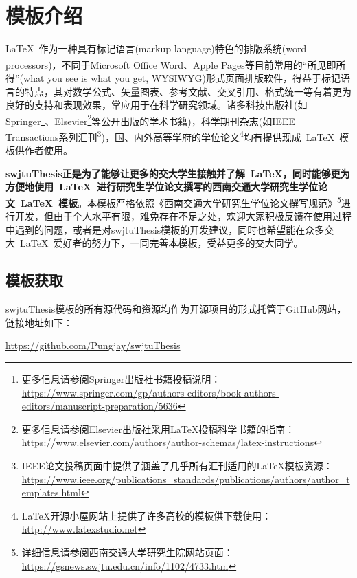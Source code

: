\chapter{模板介绍}\label{第1章}

\LaTeX{}~作为一种具有标记语言(markup language)特色的排版系统(word processors)，不同于Microsoft Office Word\textsuperscript{\textregistered}、Apple Pages\textsuperscript{\textregistered}等目前常用的“所见即所得”(what you see is what you get, WYSIWYG)形式页面排版软件，得益于标记语言的特点，其对数学公式、矢量图表、参考文献、交叉引用、格式统一等有着更为良好的支持和表现效果，常应用于在科学研究领域。诸多科技出版社(如Springer\footnote{更多信息请参阅Springer出版社书籍投稿说明：\url{https://www.springer.com/gp/authors-editors/book-authors-editors/manuscript-preparation/5636}}、Elsevier\footnote{更多信息请参阅Elsevier出版社采用\LaTeX{}投稿科学书籍的指南：\url{https://www.elsevier.com/authors/author-schemas/latex-instructions}}等公开出版的学术书籍)，科学期刊杂志(如IEEE Transactions系列汇刊\footnote{IEEE论文投稿页面中提供了涵盖了几乎所有汇刊适用的\LaTeX{}模板资源：\url{https://www.ieee.org/publications_standards/publications/authors/author_templates.html}})，国、内外高等学府的学位论文\footnote{\LaTeX 开源小屋网站上提供了许多高校的模板供下载使用：\url{http://www.latexstudio.net}}均有提供现成~\LaTeX{}~模板供作者使用。

\textbf{swjtuThesis正是为了能够让更多的交大学生接触并了解~\LaTeX{}，同时能够更为方便地使用~\LaTeX{}~进行研究生学位论文撰写的西南交通大学研究生学位论文~\LaTeX{}~模板}。本模板严格依照《西南交通大学研究生学位论文撰写规范》\footnote{详细信息请参阅西南交通大学研究生院网站页面：\url{https://gsnews.swjtu.edu.cn/info/1102/4733.htm}}进行开发，但由于个人水平有限，难免存在不足之处，欢迎大家积极反馈在使用过程中遇到的问题，或者是对swjtuThesis模板的开发建议，同时也希望能在众多交大~\LaTeX{}~爱好者的努力下，一同完善本模板，受益更多的交大同学。


\section{模板获取}

swjtuThesis模板的所有源代码和资源均作为开源项目的形式托管于GitHub网站，链接地址如下：

\begin{center}
	\url{https://github.com/Pungjay/swjtuThesis}
\end{center}

